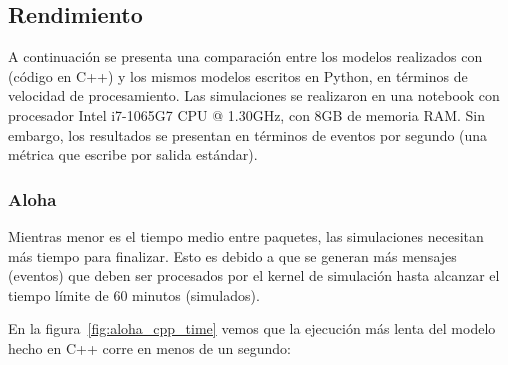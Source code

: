 \documentclass[]{article}
\begin{document}
\subsection{Rendimiento}

A continuación se presenta una comparación entre los modelos realizados con
\omnetpp{} (código en C++) y los mismos modelos escritos en Python, en términos de
velocidad de procesamiento. Las simulaciones se realizaron en una notebook con
procesador Intel i7-1065G7 CPU @ 1.30GHz, con 8GB de memoria RAM. Sin embargo,
los resultados se presentan en términos de eventos por segundo (una métrica que
\omnetpp{} escribe por salida estándar).

\subsubsection{Aloha}

Mientras menor es el tiempo medio entre paquetes, las simulaciones necesitan
más tiempo para finalizar. Esto es debido a que se generan más mensajes
(eventos) que deben ser procesados por el kernel de simulación hasta alcanzar
el tiempo límite de 60 minutos (simulados).

En la figura~\ref{fig:aloha_cpp_time} vemos que la ejecución más lenta del
modelo hecho en C++ corre en menos de un segundo:
\end{document}
